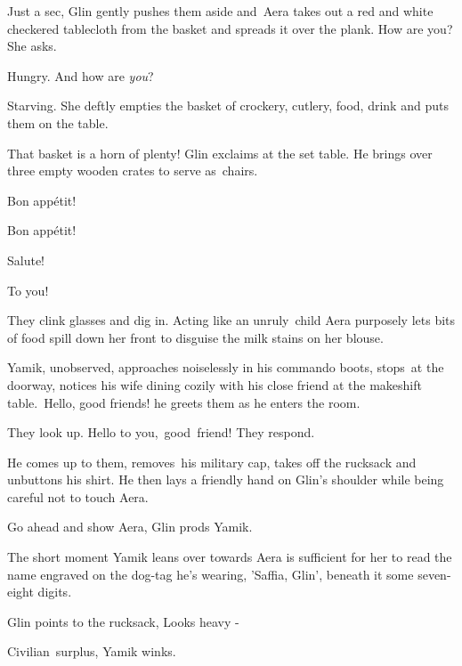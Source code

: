 \documentclass[letterpaper]{article}
\begin{document}
{\textquotedbl}Just a sec,{\textquotedbl} Glin gently pushes them aside and\ Aera takes out a red and white checkered
tablecloth from the basket and spreads it over the plank. {\textquotedbl}How are you?{\textquotedbl} She asks.\ 

{\textquotedbl}Hungry. And how are \textit{you}?{\textquotedbl} 

{\textquotedbl}Starving.{\textquotedbl} She deftly empties the basket of crockery, cutlery, food, drink and puts them on
the table. 

{\textquotedbl}That basket is a horn of plenty!{\textquotedbl} Glin exclaims at the set table. He brings over three
empty wooden crates to serve as\ chairs.\ 

{\textquotedbl}Bon app\'etit!{\textquotedbl} 

{\textquotedbl}Bon app\'etit!{\textquotedbl} 

{\textquotedbl}Salute!{\textquotedbl} 

{\textquotedbl}To you!{\textquotedbl} 

They clink glasses and dig in. Acting like an unruly\ child Aera purposely lets bits of food spill down her front to
disguise the milk stains on her blouse.\ 

Yamik, unobserved, approaches noiselessly in his commando boots, stops~at the doorway, notices his wife dining cozily
with his close friend at the makeshift table.\ {\textquotedbl}Hello, good friends!{\textquotedbl} he greets them as he
enters the room. ~

They look up. {\textquotedbl}Hello to you,\textcolor{red}{\ }good\textcolor{red}{\ }friend!{\textquotedbl} They respond.

He comes up to them, removes\textcolor[rgb]{0.0,0.4392157,0.7529412}{\ }his military cap, takes off the rucksack and
unbuttons his shirt. He then lays a friendly hand on Glin's shoulder while being careful not to touch Aera.

{\textquotedbl}Go ahead and show Aera,{\textquotedbl} Glin prods Yamik.

The short moment Yamik leans over towards Aera is sufficient for her to read the name engraved on the
dog\textcolor[rgb]{0.0,0.4392157,0.7529412}{{}-}tag he's wearing, 'Saffia, Glin', beneath it some seven-eight digits. 

Glin points to the rucksack, {\textquotedbl}Looks heavy -{\textquotedbl}~ 

{\textquotedbl}Civilian~surplus,{\textquotedbl} Yamik winks. 
\end{document}
